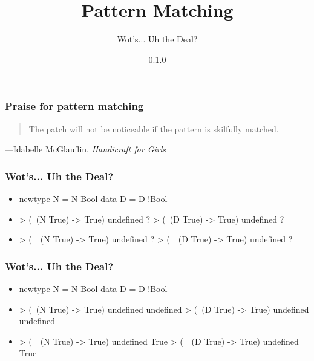 \documentclass{beamer}
\title{Pattern Matching}
\subtitle{Wot's... Uh the Deal?}
\author{}
\institute{Stack Builders}
\date{0.1.0}
\begin{document}

\frame{\titlepage}


\begin{frame}
  \frametitle{Praise for pattern matching}

  \begin{quote}
    The patch will not be noticeable if the pattern is skilfully
    matched.
  \end{quote}
  \hfill---Idabelle McGlauflin, \emph{Handicraft for Girls}
\end{frame}


\begin{frame}[fragile]
  \frametitle{Wot's... Uh the Deal?}

  \begin{itemize}
  \item
    \begin{code}
newtype N = N  Bool
data    D = D !Bool
    \end{code}
  \item
    \begin{code}
> (\  (N True) -> True) undefined
?
> (\  (D True) -> True) undefined
?
    \end{code}
  \item
    \begin{code}
> (\ ~(N True) -> True) undefined
?
> (\ ~(D True) -> True) undefined
?
    \end{code}
  \end{itemize}
\end{frame}

\begin{frame}[fragile]
  \frametitle{Wot's... Uh the Deal?}

  \begin{itemize}
  \item
    \begin{code}
newtype N = N  Bool
data    D = D !Bool
    \end{code}
  \item
    \begin{code}
> (\  (N True) -> True) undefined
undefined
> (\  (D True) -> True) undefined
undefined
    \end{code}
  \item
    \begin{code}
> (\ ~(N True) -> True) undefined
True
> (\ ~(D True) -> True) undefined
True
    \end{code}
  \end{itemize}
\end{frame}
\end{document}
